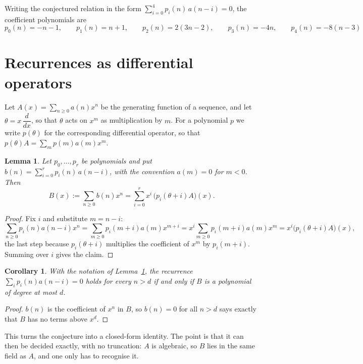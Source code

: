 \documentclass[11pt,a4paper]{article}
\theoremstyle{plain}
\newtheorem{lemma}[theorem]{Lemma}
\newtheorem{corollary}[theorem]{Corollary}
\theoremstyle{definition}
\begin{document}
Writing the conjectured relation in the form $\sum_{i=0}^{4}p_{i}(n)\,a(n-i)=0$,
the coefficient polynomials are
\[
p_{0}(n)=- n - 1,\qquad p_{1}(n)=n + 1,\qquad p_{2}(n)=2 \left(3 n - 2\right),\qquad p_{3}(n)=- 4 n,\qquad p_{4}(n)=- 8 \left(n - 3\right)
\]

\section{Recurrences as differential operators}

Let $A(x)=\sum_{n\ge0}a(n)x^{n}$ be the generating function of a sequence, and let
$\theta=x\,\dfrac{d}{dx}$, so that $\theta$ acts on $x^{m}$ as multiplication by $m$. For a
polynomial $p$ we write $p(\theta)$ for the corresponding differential operator, so that
$p(\theta)A=\sum_{m}p(m)a(m)x^{m}$.

\begin{lemma}\label{lem:transfer}
Let $p_{0},\dots,p_{r}$ be polynomials and put $b(n)=\sum_{i=0}^{r}p_{i}(n)\,a(n-i)$, with
the convention $a(m)=0$ for $m<0$. Then
\[
B(x):=\sum_{n\ge0}b(n)x^{n}=\sum_{i=0}^{r}x^{i}\,\bigl(p_{i}(\theta+i)A\bigr)(x).
\]
\end{lemma}

\begin{proof}
Fix $i$ and substitute $m=n-i$:
\[
\sum_{n\ge0}p_{i}(n)a(n-i)x^{n}=\sum_{m\ge0}p_{i}(m+i)a(m)x^{m+i}
=x^{i}\sum_{m\ge0}p_{i}(m+i)a(m)x^{m}=x^{i}\bigl(p_{i}(\theta+i)A\bigr)(x),
\]
the last step because $p_{i}(\theta+i)$ multiplies the coefficient of $x^{m}$ by
$p_{i}(m+i)$. Summing over $i$ gives the claim.
\end{proof}

\begin{corollary}\label{cor:criterion}
With the notation of Lemma~\ref{lem:transfer}, the recurrence
$\sum_{i}p_{i}(n)a(n-i)=0$ holds for every $n>d$ if and only if $B$ is a polynomial of
degree at most $d$.
\end{corollary}

\begin{proof}
$b(n)$ is the coefficient of $x^{n}$ in $B$, so $b(n)=0$ for all $n>d$ says exactly that
$B$ has no terms above $x^{d}$.
\end{proof}

This turns the conjecture into a closed-form identity. The point is that it can then be
decided exactly, with no truncation: $A$ is algebraic, so $B$ lies in the same field as
$A$, and one only has to recognise it.
\end{document}

